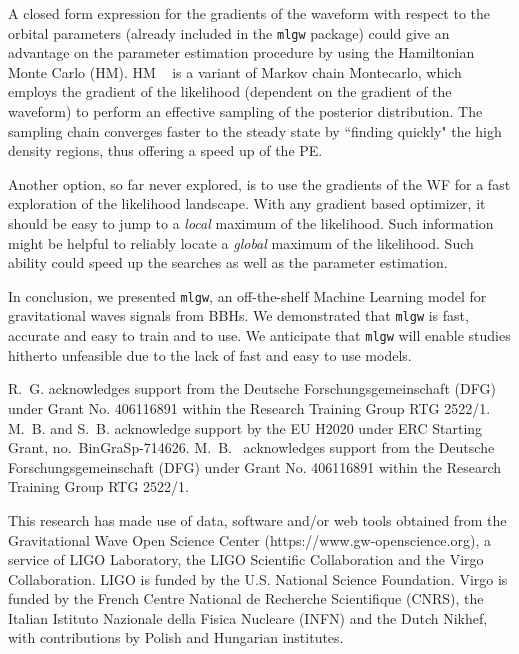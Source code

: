 \documentclass[twocolumn,showpacs,preprintnumbers,nofootinbib,prd,
superscriptaddress,10pt]{revtex4-1}
\begin{document}
A closed form expression for the gradients of the waveform with respect to the orbital parameters
(already included in the \texttt{mlgw} package)
could give an advantage on the parameter estimation procedure by using the Hamiltonian Monte Carlo (HM).
HM \cite{betancourt2017hamiltonianMC}~\cite{Porter2014Hamiltonian_MonteCarlo} is a variant of Markov chain 
Montecarlo, which employs the gradient of the likelihood (dependent on the gradient of the waveform) 
to perform an effective sampling of the posterior distribution. The sampling chain converges faster to 
the steady state by ``finding quickly" the high density regions, thus offering a speed up of the PE.

Another option, so far never explored, is to use the gradients of the WF for a fast exploration of the likelihood landscape. 
With any gradient based optimizer, it should be easy to jump to a \textit{local} maximum of the likelihood. 
Such information might be helpful to reliably locate a \textit{global} maximum of the likelihood.
Such ability could speed up the searches as well as the parameter estimation.

In conclusion, we presented \texttt{mlgw}, an off-the-shelf Machine Learning model for gravitational waves signals from BBHs. 
We demonstrated that \texttt{mlgw} is fast, accurate and easy to train and to use. We anticipate 
that \texttt{mlgw} will enable studies hitherto unfeasible due to the lack of fast and easy to use models.





        \begin{acknowledgments}
         
          R.~G. acknowledges support from the Deutsche Forschungsgemeinschaft
          (DFG) under Grant No. 406116891 within the Research Training Group
          RTG 2522/1. 
          M.~B. and S.~B. acknowledge support by the EU H2020 under ERC Starting
          Grant, no.~BinGraSp-714626.  
          M.~B.~ acknowledges support from the Deutsche Forschungsgemeinschaft
          (DFG) under Grant No. 406116891 within the Research Training Group
          RTG 2522/1. 
          
          This research has made use of data, software and/or web tools obtained 
          from the Gravitational Wave Open Science Center (https://www.gw-openscience.org), 
          a service of LIGO Laboratory, the LIGO Scientific Collaboration and the 
          Virgo Collaboration. LIGO is funded by the U.S. National Science Foundation. 
          Virgo is funded by the French Centre National de Recherche Scientifique (CNRS), 
          the Italian Istituto Nazionale della Fisica Nucleare (INFN) and the 
          Dutch Nikhef, with contributions by Polish and Hungarian institutes.
        \end{acknowledgments}

	
	
\end{document}
